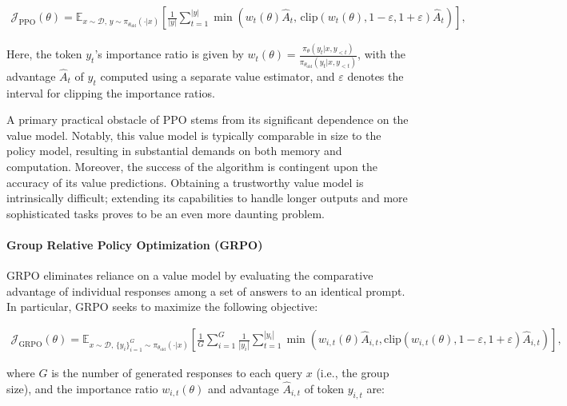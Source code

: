\begin{align}
\mathcal{J}_\text{PPO}(\theta) = \mathbb{E}_{ x \sim \mathcal{D},\, y \sim \pi_{\theta_\text{old}}( \cdot | x) }
\left[ \frac{1}{|y|} \sum_{t=1}^{|y|} 
\min \left( w_{t}(\theta) \widehat{A}_{t},  \, \mathrm{clip} \left( w_{t}(\theta), 1 - {\varepsilon}, 1 + {\varepsilon}\right) \widehat{A}_{t} \right)
\right],
\end{align}

Here, the token $y_t$'s importance ratio is given by $
w_{t}(\theta) = \frac{ \pi_{\theta} (y_{t} | x, y_{<t}) }{ \pi_{\theta_\text{old}} (y_{t} | x,y_{<t})} $, with the advantage $\widehat{A}_{t}$ of $y_t$ computed using a separate value estimator, and $\varepsilon$ denotes the interval for clipping the importance ratios.

A primary practical obstacle of PPO stems from its significant dependence on the value model. Notably, this value model is typically comparable in size to the policy model, resulting in substantial demands on both memory and computation. Moreover, the success of the algorithm is contingent upon the accuracy of its value predictions. Obtaining a trustworthy value model is intrinsically difficult; extending its capabilities to handle longer outputs and more sophisticated tasks proves to be an even more daunting problem.

\paragraph{Group Relative Policy Optimization (GRPO)} GRPO \citep{grpo} eliminates reliance on a value model by evaluating the comparative advantage of individual responses among a set of answers to an identical prompt. In particular, GRPO seeks to maximize the following objective:

\begin{align}
\label{equ:grpo}
\mathcal{J}_\text{GRPO}(\theta) = \mathbb{E}_{ x \sim \mathcal{D},\, \{y_i\}_{i=1}^G \sim \pi_{\theta_\text{old}}( \cdot | x) }
\left[ \frac{1}{G} \sum_{i=1}^{G} \frac{1}{|y_i|} \sum_{t=1}^{|y_i|} 
\min \left( w_{i,t}(\theta) \widehat{A}_{i,t}, \mathrm{clip}\left( w_{i,t}(\theta), 1 - {\varepsilon}, 1 + {\varepsilon}\right) \widehat{A}_{i,t} \right)
\right],
\end{align}

where $G$ is the number of generated responses to each query $x$ (i.e., the group size), and the importance ratio $w_{i,t}(\theta)$ and advantage $\widehat{A}_{i,t}$ of token $y_{i,t}$ are:

